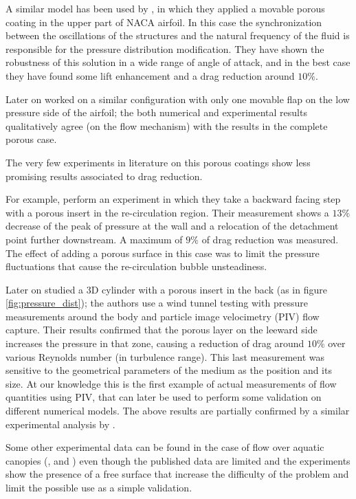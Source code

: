 A similar model has been used by \citet{venkataraman2012numerical}, in which they applied a movable porous coating in the upper part of NACA airfoil.
In this case the synchronization between the oscillations of the structures and the natural frequency of the fluid is responsible for the pressure distribution modification.
They have shown the robustness of this solution in a wide range of angle of attack, and in the best case they have found some lift enhancement and a drag reduction around $10\%$.

Later on \citet{rosti2017pelskin} worked on a similar configuration with only one movable flap on the low pressure side of the airfoil; the both numerical and experimental results qualitatively agree (on the flow mechanism) with the results in the complete porous case.


The very few experiments in literature on this porous coatings show less promising results associated to drag reduction.

For example, \citet{heenan1998passive} perform an experiment in which they take a backward facing step with a porous insert in the re-circulation region.
Their measurement shows a $13\%$ decrease of the peak of pressure at the wall and a relocation of the detachment point further downstream.
A maximum of $9\%$ of drag reduction was measured.
The effect of adding a porous surface in this case was to limit the pressure fluctuations that cause the re-circulation bubble unsteadiness.

Later on \citet{klausmann2017drag} studied a 3D cylinder with a porous insert in the back (as in figure \ref{fig:pressure_dist}); the authors use a wind tunnel testing with pressure measurements around the body and particle image velocimetry (PIV) flow capture.
Their results confirmed that the porous layer on the leeward side increases the pressure in that zone, causing a reduction of drag around $10\%$ over various Reynolds number (in turbulence range). This last measurement was sensitive to the geometrical parameters of the medium as the position and its size.
At our knowledge this is the first example of actual measurements of flow quantities using PIV, that can later be used to perform some validation on different numerical models.
The above results are partially confirmed by a similar experimental analysis by \citet{grizzetti2015esperimenti}.

Some other experimental data can be found in the case of flow over aquatic canopies (\citet{zhang2011exchange}, \citet{segalini2011experimental} and \citet{hamed2017impact}) even though the published data are limited and the experiments show the presence of a free surface that increase the difficulty of the problem and limit the possible use as a simple validation.

